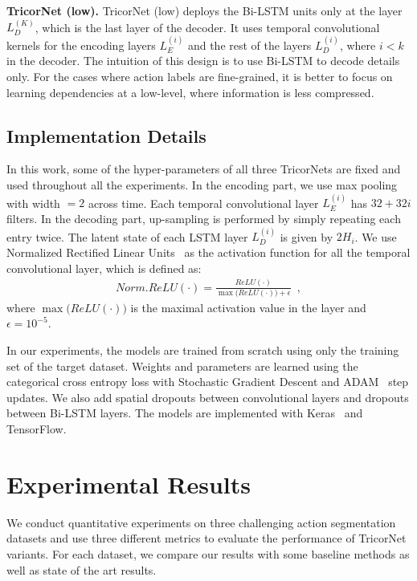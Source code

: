 \documentclass{article}
\begin{document}
\noindent \textbf{TricorNet (low).} \quad TricorNet (low) deploys the Bi-LSTM units only at the layer $L_D^{(K)}$, which is the last layer of the decoder. It uses temporal convolutional kernels for the encoding layers $L_{E}^{(i)}$ and the rest of the layers $L_{D}^{(i)}$, where $i<k$ in the decoder. The intuition of this design is to use Bi-LSTM to decode details only. For the cases where action labels are fine-grained, it is better to focus on learning dependencies at a low-level, where information is less compressed.


\subsection{Implementation Details}

In this work, some of the hyper-parameters of all three TricorNets are fixed and used throughout all the experiments. In the encoding part, we use max pooling with width $=2$ across time. Each temporal convolutional layer $L_{E}^{(i)}$ has $32+32i$ filters. In the decoding part, up-sampling is performed by simply repeating each entry twice. The latent state of each LSTM layer $L_{D}^{(i)}$ is given by $2H_i$. We use Normalized Rectified Linear Units~\cite{LeFlViCVPR2017} as the activation function for all the temporal convolutional layer, which is defined as:
\begin{align}
Norm. ReLU(\cdot)=\frac{ReLU(\cdot)}{\max\big(ReLU(\cdot)\big)+\epsilon}
\enspace,
\end{align}
where $\max\big(ReLU(\cdot)\big)$ is the maximal activation value in the layer and $\epsilon = 10^{-5}$.

In our experiments, the models are trained from scratch using only the training set of the target dataset. Weights and parameters are learned using the categorical cross entropy loss with Stochastic Gradient Descent and ADAM~\cite{adam} step updates. We also add spatial dropouts between convolutional layers and dropouts between Bi-LSTM layers. The models are implemented with Keras~\cite{keras} and TensorFlow.


\section{Experimental Results}
\label{sec:exp}

We conduct quantitative experiments on three challenging action segmentation datasets and use three different metrics to evaluate the performance of TricorNet variants. For each dataset, we compare our results with some baseline methods as well as state of the art results.
\end{document}
